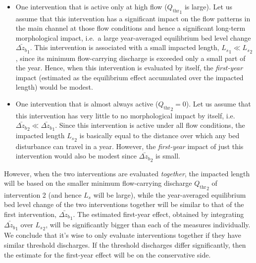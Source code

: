 \begin{enumerate}
\begin{itemize}
\item One intervention that is active only at high flow (${Q_\text{thr}}_1$ is large).
Let us assume that this intervention has a significant impact on the flow patterns in the main channel at those flow conditions and hence a significant long-term morphological impact, i.e.~a large year-averaged equilibrium bed level change $\bar{\Delta z_b}_1$.
This intervention is associated with a small impacted length, ${L_s}_1 \ll {L_s}_2$, since its minimum flow-carrying discharge is exceeded only a small part of the year.
Hence, when this intervention is evaluated by itself, the \emph{first-year} impact (estimated as the equilibrium effect accumulated over the impacted length) would be modest.

\item One intervention that is almost always active (${Q_\text{thr}}_2 = 0$).
Let us assume that this intervention has very little to no morphological impact by itself, i.e.~$\bar{\Delta z_b}_2 \ll \bar{\Delta z_b}_1$.
Since this intervention is active under all flow conditions, the impacted length ${L_s}_2$ is basically equal to the distance over which any bed disturbance can travel in a year.
However, the \emph{first-year} impact of just this intervention would also be modest since $\bar{\Delta z_b}_2$ is small.
\end{itemize}

However, when the two interventions are evaluated \emph{together}, the impacted length will be based on the smaller minimum flow-carrying discharge ${Q_\text{thr}}_2$ of intervention 2 (and hence $L_s$ will be large), while the year-averaged equilibrium bed level change of the two interventions together will be similar to that of the first intervention, $\bar{\Delta z_b}_1$.
The estimated first-year effect, obtained by integrating $\bar{\Delta z_b}_1$ over ${L_s}_2$, will be significantly bigger than each of the measures individually.
We conclude that it's wise to only evaluate interventions together if they have similar threshold discharges.
If the threshold discharges differ significantly, then the estimate for the first-year effect will be on the conservative side.


\end{enumerate}
